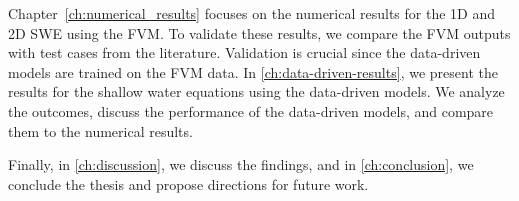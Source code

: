 Chapter~\ref{ch:numerical_results} focuses on the numerical results for the 1D and 2D SWE using the FVM.
To validate these results, we compare the FVM outputs with test cases from the literature. Validation is crucial since the data-driven models are trained on the FVM data.
In \autoref{ch:data-driven-results}, we present the results for the shallow water equations using the data-driven models.
We analyze the outcomes, discuss the performance of the data-driven models, and compare them to the numerical results.

Finally, in \autoref{ch:discussion}, we discuss the findings, and in \autoref{ch:conclusion}, we conclude the thesis and propose directions for future work.


